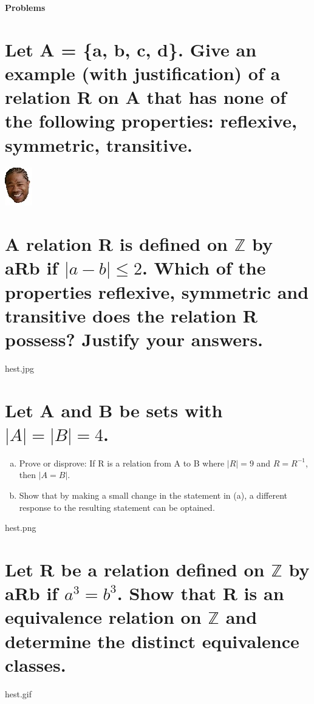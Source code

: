\textbf{\Huge Problems}
\section{Let A = \{a, b, c, d\}. Give an example (with justification) of a relation R on A that has none of the following properties: reflexive, symmetric, transitive.}
\includegraphics[scale=0.70]{billeder/xzibit}

\section{A relation R is defined on $\mathbb{Z}$ by aRb if $|a-b|\leq 2$. Which of the properties reflexive, symmetric and transitive does the relation R possess? Justify your answers.}
hest.jpg


\section{Let A and B be sets with $|A|=|B|=4$.}
\begin{enumerate}[a.]
\item Prove or disprove: If R is a relation from A to B where $|R|=9$ and $R = R^{-1}$, then $|A=B|$.
\item Show that by making a small change in the statement in (a), a different response to the resulting statement can be optained.
\end{enumerate}
hest.png


\section{Let R be a relation defined on $\mathbb{Z}$ by aRb if $a^3 = b^3$. Show that R is an equivalence relation on $\mathbb{Z}$ and determine the distinct equivalence classes.}
hest.gif


